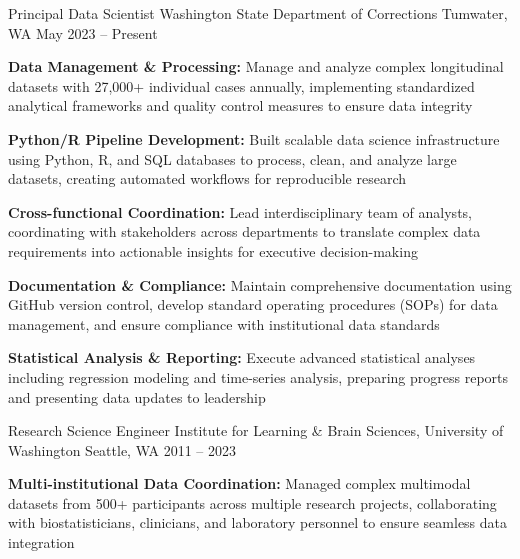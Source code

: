 
\begin{cventries}

  \cventry
    {Principal Data Scientist}
    {Washington State Department of Corrections}
    {Tumwater, WA}
    {May 2023 -- Present}
    {
      \begin{cvitems}
        \item \textbf{Data Management \& Processing:} Manage and analyze complex longitudinal datasets with 27,000+ individual cases annually, implementing standardized analytical frameworks and quality control measures to ensure data integrity
        \item \textbf{Python/R Pipeline Development:} Built scalable data science infrastructure using Python, R, and SQL databases to process, clean, and analyze large datasets, creating automated workflows for reproducible research
        \item \textbf{Cross-functional Coordination:} Lead interdisciplinary team of analysts, coordinating with stakeholders across departments to translate complex data requirements into actionable insights for executive decision-making
        \item \textbf{Documentation \& Compliance:} Maintain comprehensive documentation using GitHub version control, develop standard operating procedures (SOPs) for data management, and ensure compliance with institutional data standards
        \item \textbf{Statistical Analysis \& Reporting:} Execute advanced statistical analyses including regression modeling and time-series analysis, preparing progress reports and presenting data updates to leadership
      \end{cvitems}
    }
  \cventry
    {Research Science Engineer}
    {Institute for Learning \& Brain Sciences, University of Washington}
    {Seattle, WA}
    {2011 -- 2023}
    {
      \begin{cvitems}
        \item \textbf{Multi-institutional Data Coordination:} Managed complex multimodal datasets from 500+ participants across multiple research projects, collaborating with biostatisticians, clinicians, and laboratory personnel to ensure seamless data integration

\end{cvitems}}
\end{cventries}
